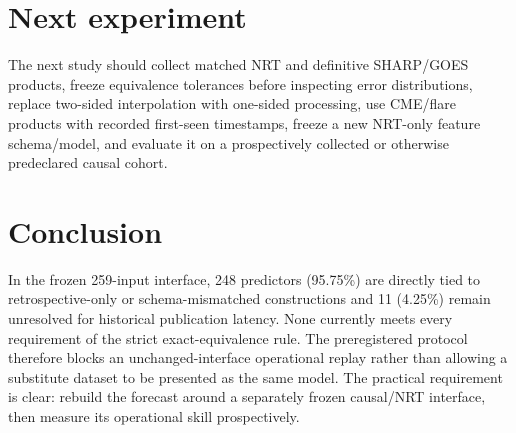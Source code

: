 \documentclass[11pt]{article}
\begin{document}
\section{Next experiment}
The next study should collect matched NRT and definitive SHARP/GOES products, freeze equivalence tolerances before inspecting error distributions, replace two-sided interpolation with one-sided processing, use CME/flare products with recorded first-seen timestamps, freeze a new NRT-only feature schema/model, and evaluate it on a prospectively collected or otherwise predeclared causal cohort.

\section{Conclusion}
In the frozen 259-input interface, 248 predictors (95.75\%) are directly tied to retrospective-only or schema-mismatched constructions and 11 (4.25\%) remain unresolved for historical publication latency. None currently meets every requirement of the strict exact-equivalence rule. The preregistered protocol therefore blocks an unchanged-interface operational replay rather than allowing a substitute dataset to be presented as the same model. The practical requirement is clear: rebuild the forecast around a separately frozen causal/NRT interface, then measure its operational skill prospectively.
\end{document}
